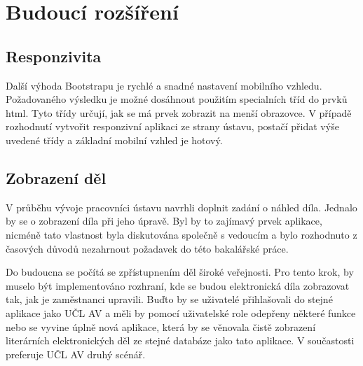 
\chapter{Budoucí rozšíření}
        
    \section{Responzivita}
        Další výhoda Bootstrapu je rychlé a snadné nastavení mobilního vzhledu. Požadovaného výsledku je možné dosáhnout použitím specialních tříd do prvků html. Tyto třídy určují, jak se má prvek zobrazit na menší obrazovce. V případě rozhodnutí vytvořit responzivní aplikaci ze strany ústavu, postačí přidat výše uvedené třídy a základní mobilní vzhled je hotový.
        
        
    \section{Zobrazení děl}
        V průběhu vývoje pracovníci ústavu navrhli doplnit zadání o náhled díla. Jednalo by se o zobrazení díla při jeho úpravě. Byl by to zajímavý prvek aplikace, nicméně tato vlastnost byla diskutována společně s vedoucím a bylo rozhodnuto z časových důvodů nezahrnout požadavek do této bakalářské práce.
        
        Do budoucna se počítá se zpřístupnením děl široké veřejnosti. Pro tento krok, by muselo být implementováno rozhraní, kde se budou elektronická díla zobrazovat tak, jak je zaměstnanci upravili. Buďto by se uživatelé přihlašovali do stejné aplikace jako UČL AV a měli by pomocí uživatelské  role odepřeny některé funkce nebo se vyvine úplně nová aplikace, která by se věnovala čistě zobrazení literárních elektronických děl ze stejné databáze jako tato aplikace. V součastosti preferuje UČL AV druhý scénář.
        
        
